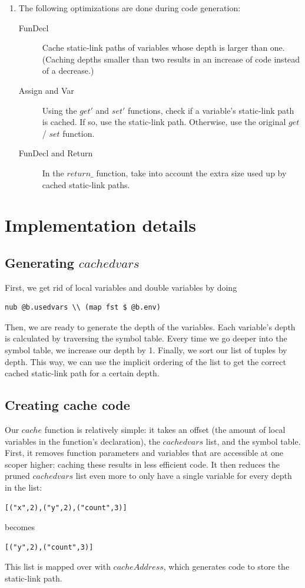 \documentclass[10pt,a4paper,onecolumn]{article}
\begin{document}
\begin{enumerate}
        \item The following optimizations are done during code generation:
        \begin{description}
            \item[FunDecl] Cache static-link paths of variables whose depth is larger than one. (Caching depths smaller than two results in an increase of code instead of a decrease.)
            \item[Assign and Var] Using the $ get' $ and $ set' $ functions, check if a variable's static-link path is cached. If so, use the static-link path. Otherwise, use the original $ get $ / $ set $ function.
            \item[FunDecl and Return] In the $ return\_ $ function, take into account the extra size used up by cached static-link paths.
        \end{description} 
    \end{enumerate}
    
    \section {Implementation details}
    
    \subsection {Generating $ cachedvars $}
	First, we get rid of local variables and double variables by doing
	\begin{lstlisting}
nub @b.usedvars \\ (map fst $ @b.env)
	\end{lstlisting} 
	Then, we are ready to generate the depth of the variables. 
	Each variable's depth is calculated by traversing the symbol table. Every time we go deeper into the symbol table, we increase our depth by 1.
	Finally, we sort our list of tuples by depth. This way, we can use the implicit ordering of the list to get the correct cached static-link path for a certain depth.

    \subsection {Creating cache code}
	Our $ cache $ function is relatively simple: it takes an offset (the amount of local variables in the function's declaration), the $ cachedvars $ list, and the symbol table.
	First, it removes function parameters and variables that are accessible at one scoper higher: caching these results in less efficient code.
	It then reduces the pruned $ cachedvars $ list even more to only have a single variable for every depth in the list:
	\begin{lstlisting}
[("x",2),("y",2),("count",3)]
	\end{lstlisting} 
	becomes
	\begin{lstlisting}
[("y",2),("count",3)] 
	\end{lstlisting} 
	This list is mapped over with $ cacheAddress $, which generates code to store the static-link path.
\end{document}

